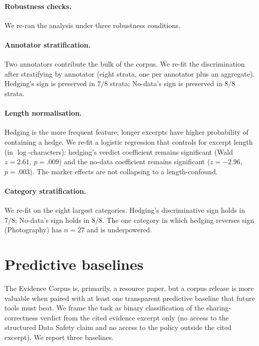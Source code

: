 \documentclass[11pt,a4paper]{article}
\begin{document}
\paragraph{Robustness checks.}
We re-ran the analysis under three robustness conditions.

\paragraph{Annotator stratification.}
Two annotators contribute the bulk of the corpus. We re-fit the
discrimination after stratifying by annotator (eight strata, one per
annotator plus an aggregate). Hedging's sign is preserved in
$7/8$ strata; No-data's sign is preserved in $8/8$ strata.

\paragraph{Length normalisation.}
Hedging is the more frequent feature; longer excerpts have higher
probability of containing a hedge. We re-fit a logistic regression
that controls for excerpt length (in $\log$-characters): hedging's
verdict coefficient remains significant (Wald
$z=2.61$, $p=.009$) and the no-data coefficient remains significant
($z=-2.96$, $p=.003$). The marker effects are not collapsing to a
length-confound.

\paragraph{Category stratification.}
We re-fit on the eight largest categories. Hedging's discriminative
sign holds in $7/8$; No-data's sign holds in $8/8$. The one category
in which hedging reverses sign (Photography) has $n=27$ and is
underpowered.

\section{Predictive baselines}\label{sec:baselines}
The Evidence Corpus is, primarily, a resource paper, but a corpus
release is more valuable when paired with at least one transparent
predictive baseline that future tools must beat. We frame the task as
binary classification of the sharing-correctness verdict from the
cited evidence excerpt only (no access to the structured Data Safety
claim and no access to the policy outside the cited excerpt). We
report three baselines.
\end{document}

